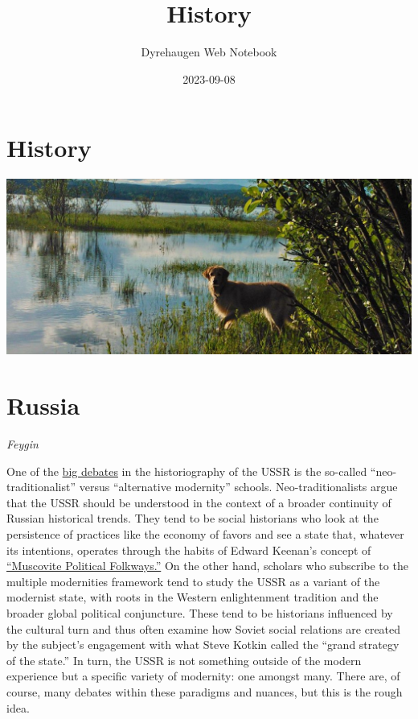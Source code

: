 \documentclass[
]{book}
\title{History}
\author{Dyrehaugen Web Notebook}
\date{2023-09-08}
\begin{document}
\maketitle

{
\setcounter{tocdepth}{1}
\tableofcontents
}
\hypertarget{history}{%
\chapter{History}\label{history}}

\includegraphics{fig/zelda.jpg}

\hypertarget{russia}{%
\chapter{Russia}\label{russia}}

\emph{Feygin}

One of the \href{https://www.jstor.org/stable/41051747}{big debates} in the historiography of the USSR is the so-called ``neo-traditionalist'' versus ``alternative modernity'' schools. Neo-traditionalists argue that the USSR should be understood in the context of a broader continuity of Russian historical trends. They tend to be social historians who look at the persistence of practices like the economy of favors and see a state that, whatever its intentions, operates through the habits of Edward Keenan's concept of \href{https://www.jstor.org/stable/130423}{``Muscovite Political Folkways.''} On the other hand, scholars who subscribe to the multiple modernities framework tend to study the USSR as a variant of the modernist state, with roots in the Western enlightenment tradition and the broader global political conjuncture. These tend to be historians influenced by the cultural turn and thus often examine how Soviet social relations are created by the subject's engagement with what Steve Kotkin called the ``grand strategy of the state.'' In turn, the USSR is not something outside of the modern experience but a specific variety of modernity: one amongst many. There are, of course, many debates within these paradigms and nuances, but this is the rough idea.
\end{document}
